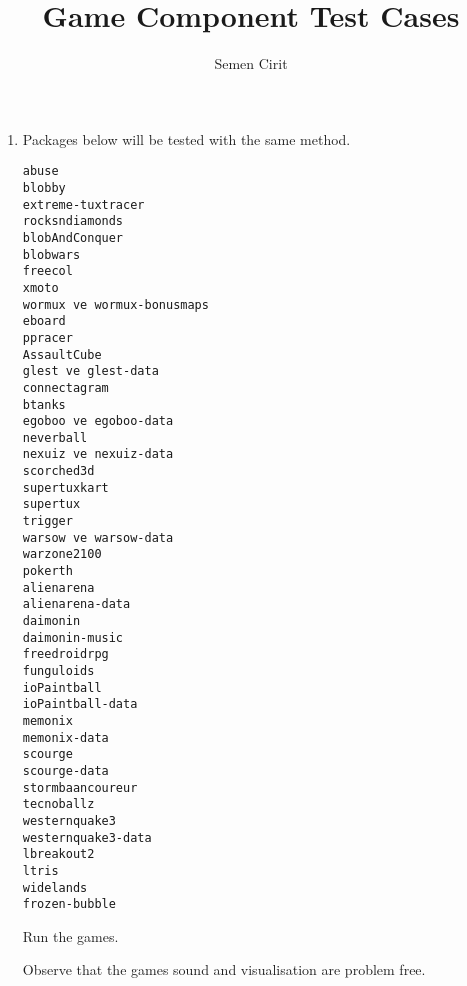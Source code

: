 \documentclass[a4paper,10pt]{article}
\title{Game Component Test Cases }
\author{Semen Cirit}
\begin{document}
\maketitle

\begin{enumerate}
\item Packages below will be tested with the same method.
\begin{verbatim}
abuse
blobby
extreme-tuxtracer
rocksndiamonds 
blobAndConquer
blobwars
freecol
xmoto
wormux ve wormux-bonusmaps
eboard
ppracer
AssaultCube
glest ve glest-data
connectagram
btanks
egoboo ve egoboo-data
neverball
nexuiz ve nexuiz-data
scorched3d
supertuxkart
supertux
trigger
warsow ve warsow-data
warzone2100
pokerth
alienarena
alienarena-data
daimonin
daimonin-music
freedroidrpg
funguloids
ioPaintball
ioPaintball-data
memonix
memonix-data
scourge
scourge-data
stormbaancoureur
tecnoballz
westernquake3
westernquake3-data
lbreakout2
ltris
widelands
frozen-bubble
\end{verbatim}

Run the games.

Observe that the games sound and visualisation are problem free.
\end{enumerate}
\end{document}
